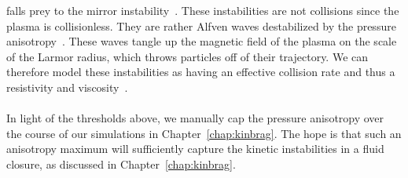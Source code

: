 falls prey to the mirror instability~\cite{Kunz2016,Kunz2014,Schekochihin2008,Sharma2008}. These instabilities are not collisions since the plasma is collisionless. They are rather Alfven waves destabilized by the pressure anisotropy~\cite{Sharma2008}. These waves tangle up the magnetic field of the plasma on the scale of the Larmor radius, which throws particles off of their trajectory. We can therefore model these instabilities as having an effective collision rate and thus a resistivity and viscosity~\cite{Schekochihin2008,Kunz2017p}.\\
\\
In light of the thresholds above, we manually cap the pressure anisotropy over the course of our simulations in Chapter~\ref{chap:kinbrag}. The hope is that such an anisotropy maximum will sufficiently capture the kinetic instabilities in a fluid closure, as discussed in Chapter~\ref{chap:kinbrag}.












